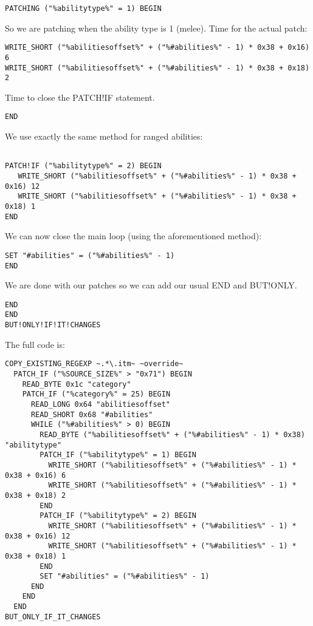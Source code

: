 \documentclass{article}
\begin{document}
\begin{verbatim}
PATCHING ("%abilitytype%" = 1) BEGIN
\end{verbatim}
So we are patching when the ability type is 1 (melee). Time for the actual patch:
\begin{verbatim}
WRITE_SHORT ("%abilitiesoffset%" + ("%#abilities%" - 1) * 0x38 + 0x16) 6
WRITE_SHORT ("%abilitiesoffset%" + ("%#abilities%" - 1) * 0x38 + 0x18) 2
\end{verbatim}
Time to close the PATCH!IF statement.
\begin{verbatim}
END
\end{verbatim}
We use exactly the same method for ranged abilities:
\begin{verbatim}

PATCH!IF ("%abilitytype%" = 2) BEGIN
   WRITE_SHORT ("%abilitiesoffset%" + ("%#abilities%" - 1) * 0x38 + 0x16) 12
   WRITE_SHORT ("%abilitiesoffset%" + ("%#abilities%" - 1) * 0x38 + 0x18) 1
END
\end{verbatim}
We can now close the main loop (using the aforementioned method):
\begin{verbatim}
SET "#abilities" = ("%#abilities%" - 1)
END
\end{verbatim}
We are done with our patches so we can add our usual END and BUT!ONLY.
\begin{verbatim}
END
END
BUT!ONLY!IF!IT!CHANGES
\end{verbatim}
The full code is:
\begin{verbatim}
COPY_EXISTING_REGEXP ~.*\.itm~ ~override~
  PATCH_IF ("%SOURCE_SIZE%" > "0x71") BEGIN
    READ_BYTE 0x1c "category"
    PATCH_IF ("%category%" = 25) BEGIN
      READ_LONG 0x64 "abilitiesoffset"
      READ_SHORT 0x68 "#abilities"
      WHILE ("%#abilities%" > 0) BEGIN
        READ_BYTE ("%abilitiesoffset%" + ("%#abilities%" - 1) * 0x38) "abilitytype"
        PATCH_IF ("%abilitytype%" = 1) BEGIN
          WRITE_SHORT ("%abilitiesoffset%" + ("%#abilities%" - 1) * 0x38 + 0x16) 6
          WRITE_SHORT ("%abilitiesoffset%" + ("%#abilities%" - 1) * 0x38 + 0x18) 2
        END
        PATCH_IF ("%abilitytype%" = 2) BEGIN
          WRITE_SHORT ("%abilitiesoffset%" + ("%#abilities%" - 1) * 0x38 + 0x16) 12
          WRITE_SHORT ("%abilitiesoffset%" + ("%#abilities%" - 1) * 0x38 + 0x18) 1
        END
        SET "#abilities" = ("%#abilities%" - 1)
      END
    END
  END
BUT_ONLY_IF_IT_CHANGES
\end{verbatim}
\end{document}
